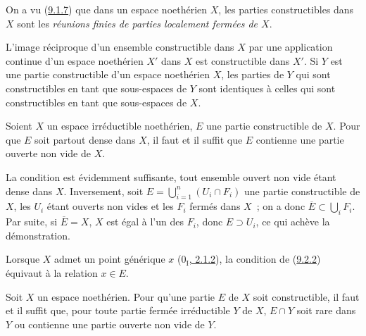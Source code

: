 \begin{env}[9.2.1]
\label{0.9.2.1-fr}
On a vu (\hyperref[0.9.1.7-fr]{9.1.7}) que dans un espace noethérien $X$, les
parties constructibles dans $X$ sont les \emph{réunions finies de parties
localement fermées de $X$}.

L'image réciproque d'un ensemble constructible dans $X$ par une application
continue d'un espace noethérien $X'$ dans $X$ est constructible dans $X'$.
Si $Y$ est une partie constructible d'un espace noethérien $X$, les parties
de $Y$ qui sont constructibles en tant que sous-espaces de $Y$ sont
identiques à celles qui sont constructibles en tant que sous-espaces de $X$.
\end{env}

\begin{proposition}[9.2.2]
\label{0.9.2.2-fr}
Soient $X$ un espace irréductible noethérien, $E$ une partie constructible de
$X$. Pour que $E$ soit partout dense dans $X$, il faut et il suffit que $E$
contienne une partie ouverte non vide de $X$.
\end{proposition}

La condition est évidemment suffisante, tout ensemble ouvert non vide étant
dense dans $X$. Inversement, soit
$E=\bigcup_{i=1}^n(U_i\cap F_i)$ une partie constructible de $X$, les $U_i$
étant ouverts non vides et les $F_i$ fermés dans $X$~; on a donc
$\overline{E}\subset\bigcup_i F_i$. Par suite, si $\overline{E}=X$, $X$ est
égal à l'un des $F_i$, donc $E\supset U_i$, ce qui achève la démonstration.

Lorsque $X$ admet un point générique $x$
(\hyperref[0.2.1.2-fr]{$0_{\mathrm I}$, 2.1.2}), la condition de
(\hyperref[0.9.2.2-fr]{9.2.2}) équivaut à la relation $x\in E$.

\begin{proposition}[9.2.3]
\label{0.9.2.3-fr}
Soit $X$ un espace noethérien. Pour qu'une partie $E$ de $X$ soit
constructible, il faut et il suffit que, pour toute partie fermée
irréductible $Y$ de $X$, $E\cap Y$ soit rare dans $Y$ ou contienne une partie
ouverte non vide de $Y$.
\end{proposition}

